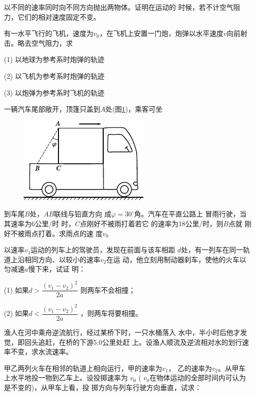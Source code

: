 \begin{exercises}

\exercise 以不同的速率同时向不同方向抛出两物体。证明在运动的
时候，若不计空气阻力，它们的相对速度固定不变。

\exercise 有一水平飞行的飞机，速度为$ v _ { 0 }$，在飞机上安置一门炮，炮弹以水平速度$ v $向前射击。略去空气阻力，求

(1) 以地球为参考系时炮弹的轨迹

(2) 以飞机为参考系时炮弹的轨迹

(3) 以炮弹为参考系时飞机的轨迹

\exercise 一辆汽车尾部敞开，顶篷只盖到$A$处(图\ref{fig:02.17})，乘客可坐
\begin{figure}
  \includegraphics{figure/fig02.17}
  \caption{}
  \label{fig:02.17}
\end{figure}
到车尾$B$处，$AB$联线与铅直方向
成$ \varphi = 3 0 ^ { \circ }  $角。汽车在平直公路上
冒雨行驶，当其速率为6公里/时
时，$C$点刚好不被雨打着若它
的速率为18公里/时，则$B$点就
刚好不被雨点打着。求雨点的速
度$ v _ { 0 }$

\exercise 以速率$ v _ { 1 }  $运动的列车上的驾驶员，发现在前面与该车相距
$d$处，有一列车在同一轨道上沿相同方向、以较小的速率$v_2$在运
动，他立刻用制动器刹车，使他的火车以匀减速$a$慢下来，试证
明：

(1) 如果$d > \dfrac { \left( v _ { 1 } - v _ { 2 } \right) ^ { 2 } } { 2 a }$
则两车不会相撞；

(2) 如果$d < \dfrac { \left( v _ { 1 } - v _ { 2 } \right) ^ { 2 } } { 2 a }$
，则两车将要相撞。

\clearpage
\exercise 渔人在河中乘舟逆流航行，经过某桥下时，一只水桶落入
水中，半小时后他才发觉，即回头追赶，在桥的下游5.0公里处赶
上。设渔人顺流及逆流相对水的划行速率不变，求水流速率。

\exercise 甲乙两列火车在相邻的轨道上相向运行，甲的速率为$v_1$，
乙的速率为$v_2$。从甲车上水平地投一物到乙车上。设投掷速率为
$v _ { 0 }$ ( $v_0  $在物体运动的全部时间内可认为是不变的)，从甲车上看，投
掷方向与列车行驶方向垂直，试求：


\end{exercises}
